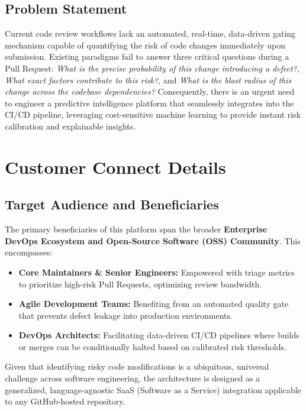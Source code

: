 \documentclass[12pt, a4paper]{article}
\begin{document}
\subsection{Problem Statement}
Current code review workflows lack an automated, real-time, data-driven gating mechanism capable of quantifying the risk of code changes immediately upon submission. Existing paradigms fail to answer three critical questions during a Pull Request: \textit{What is the precise probability of this change introducing a defect?}, \textit{What exact factors contribute to this risk?}, and \textit{What is the blast radius of this change across the codebase dependencies?} Consequently, there is an urgent need to engineer a predictive intelligence platform that seamlessly integrates into the CI/CD pipeline, leveraging cost-sensitive machine learning to provide instant risk calibration and explainable insights.

\clearpage
\section{Customer Connect Details}

\subsection{Target Audience and Beneficiaries}
The primary beneficiaries of this platform span the broader \textbf{Enterprise DevOps Ecosystem and Open-Source Software (OSS) Community}. This encompasses:
\begin{itemize}
    \item \textbf{Core Maintainers \& Senior Engineers:} Empowered with triage metrics to prioritize high-risk Pull Requests, optimizing review bandwidth.
    \item \textbf{Agile Development Teams:} Benefiting from an automated quality gate that prevents defect leakage into production environments.
    \item \textbf{DevOps Architects:} Facilitating data-driven CI/CD pipelines where builds or merges can be conditionally halted based on calibrated risk thresholds.
\end{itemize}
Given that identifying risky code modifications is a ubiquitous, universal challenge across software engineering, the architecture is designed as a generalized, language-agnostic SaaS (Software as a Service) integration applicable to any GitHub-hosted repository.
\end{document}
